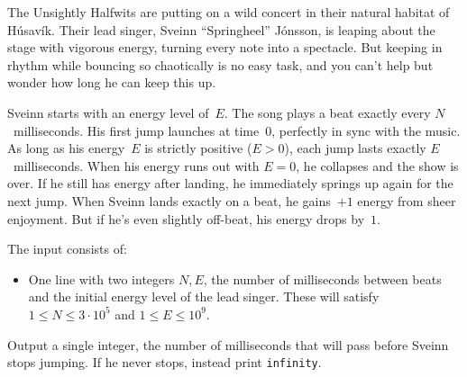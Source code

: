 

The Unsightly Halfwits are putting on a wild concert in their natural habitat of Húsavík.
Their lead singer, Sveinn “Springheel” Jónsson, is leaping about the stage with vigorous energy, 
turning every note into a spectacle.
But keeping in rhythm while bouncing so chaotically is no easy task, and you can’t help but wonder 
how long he can keep this up.

Sveinn starts with an energy level of~$E$.
The song plays a beat exactly every $N$~milliseconds.
His first jump launches at time~$0$, perfectly in sync with the music. As long as his energy~$E$ is strictly positive ($E>0$), each jump lasts exactly $E$~milliseconds.
When his energy runs out with $E=0$, he collapses and the show is over. If he still has energy after landing, he immediately springs up again for the next jump.
When Sveinn lands exactly on a beat, he gains~$+1$ energy from sheer enjoyment.
But if he’s even slightly off-beat, his energy drops by~$1$.

\begin{Input}
    The input consists of:
    \begin{itemize}
        \item One line with two integers $N, E$, the number of milliseconds between beats and the initial energy level of the lead singer. These will satisfy $1 \leq N \leq 3 \cdot 10^5$ and $1 \leq E \leq 10^9$.
    \end{itemize}
\end{Input}

\begin{Output}
  Output a single integer, the number of milliseconds that
    will pass before Sveinn stops jumping. 
    If he never stops, instead print \texttt{infinity}.
\end{Output}
